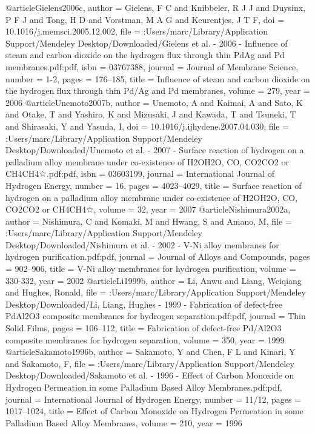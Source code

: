@article{Gielens2006c,
author = {Gielens, F C and Knibbeler, R J J and Duysinx, P F J and Tong, H D and Vorstman, M A G and Keurentjes, J T F},
doi = {10.1016/j.memsci.2005.12.002},
file = {:Users/marc/Library/Application Support/Mendeley Desktop/Downloaded/Gielens et al. - 2006 - Influence of steam and carbon dioxide on the hydrogen flux through thin PdAg and Pd membranes.pdf:pdf},
isbn = {03767388},
journal = {Journal of Membrane Science},
number = {1-2},
pages = {176--185},
title = {{Influence of steam and carbon dioxide on the hydrogen flux through thin Pd/Ag and Pd membranes}},
volume = {279},
year = {2006}
}
@article{Unemoto2007b,
author = {Unemoto, A and Kaimai, A and Sato, K and Otake, T and Yashiro, K and Mizusaki, J and Kawada, T and Tsuneki, T and Shirasaki, Y and Yasuda, I},
doi = {10.1016/j.ijhydene.2007.04.030},
file = {:Users/marc/Library/Application Support/Mendeley Desktop/Downloaded/Unemoto et al. - 2007 - Surface reaction of hydrogen on a palladium alloy membrane under co-existence of H2OH2O, CO, CO2CO2 or CH4CH4☆.pdf:pdf},
isbn = {03603199},
journal = {International Journal of Hydrogen Energy},
number = {16},
pages = {4023--4029},
title = {{Surface reaction of hydrogen on a palladium alloy membrane under co-existence of H2OH2O, CO, CO2CO2 or CH4CH4☆}},
volume = {32},
year = {2007}
}
@article{Nishimura2002a,
author = {Nishimura, C and Komaki, M and Hwang, S and Amano, M},
file = {:Users/marc/Library/Application Support/Mendeley Desktop/Downloaded/Nishimura et al. - 2002 - V-Ni alloy membranes for hydrogen purification.pdf:pdf},
journal = {Journal of Alloys and Compounds},
pages = {902--906},
title = {{V-Ni alloy membranes for hydrogen purification}},
volume = {330-332},
year = {2002}
}
@article{Li1999b,
author = {Li, Anwu and Liang, Weiqiang and Hughes, Ronald},
file = {:Users/marc/Library/Application Support/Mendeley Desktop/Downloaded/Li, Liang, Hughes - 1999 - Fabrication of defect-free PdAl2O3 composite membranes for hydrogen separation.pdf:pdf},
journal = {Thin Solid Films},
pages = {106--112},
title = {{Fabrication of defect-free Pd/Al2O3 composite membranes for hydrogen separation}},
volume = {350},
year = {1999}
}
@article{Sakamoto1996b,
author = {Sakamoto, Y and Chen, F L and Kinari, Y and Sakamoto, F},
file = {:Users/marc/Library/Application Support/Mendeley Desktop/Downloaded/Sakamoto et al. - 1996 - Effect of Carbon Monoxide on Hydrogen Permeation in some Palladium Based Alloy Membranes.pdf:pdf},
journal = {International Journal of Hydrogen Energy},
number = {11/12},
pages = {1017--1024},
title = {{Effect of Carbon Monoxide on Hydrogen Permeation in some Palladium Based Alloy Membranes}},
volume = {210},
year = {1996}
}
